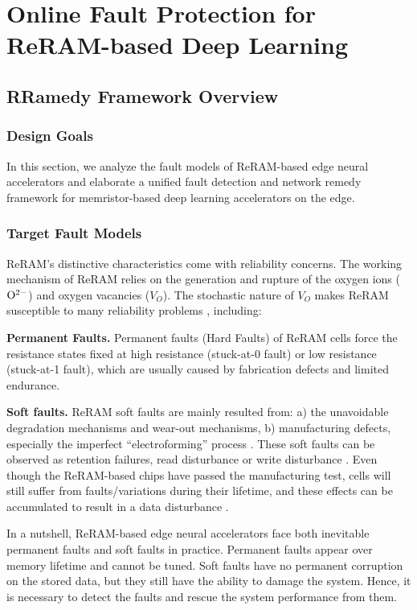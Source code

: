 \section{Online Fault Protection for ReRAM-based Deep Learning}
\subsection{RRamedy Framework Overview}
\subsubsection{Design Goals}
In this section, we analyze the fault models of ReRAM-based edge neural accelerators and elaborate a unified fault detection and network remedy framework for memristor-based deep learning accelerators on the edge. 
\subsubsection{Target Fault Models} 
ReRAM's distinctive characteristics come with reliability concerns. The working mechanism of ReRAM relies on the generation and rupture of the oxygen ions (${{\rm{O}}^{2 - }}$) and oxygen vacancies  (${V_O}$). The stochastic nature of ${V_O}$ makes ReRAM susceptible to many reliability problems \cite{7987496}, including:


{\bf Permanent Faults. } Permanent faults (Hard Faults) of ReRAM cells force the resistance states fixed at high resistance (stuck-at-0 fault) or low resistance (stuck-at-1 fault), which are usually caused by fabrication defects \cite{6725492} and limited endurance. 


{\bf Soft faults.} ReRAM soft faults are mainly resulted from: a) the unavoidable degradation mechanisms and wear-out mechanisms, b) manufacturing defects, especially the imperfect ``electroforming'' process \cite{6957074, Liu:2019:FTN:3287624.3288743}. These soft faults can be observed as retention failures, read disturbance or write disturbance \cite{7879109,8267883}. Even though the ReRAM-based chips have passed the manufacturing test, cells will still suffer from faults/variations during their lifetime, and these effects can be accumulated to result in a data disturbance \cite{8624687}. 

In a nutshell, ReRAM-based edge neural accelerators face both inevitable permanent faults and soft faults in practice.  Permanent faults appear over memory lifetime and cannot be tuned. Soft faults have no permanent corruption on the stored data, but they still have the ability to damage the system. Hence, it is necessary to detect the faults and rescue the system performance from them.  

